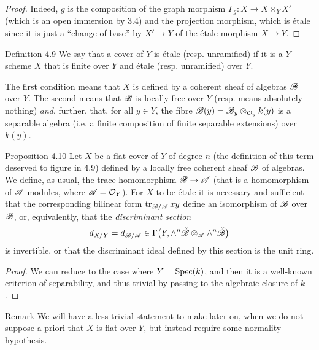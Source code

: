 \begin{proof}
  Indeed, $g$ is the composition of the graph morphism $\Gamma_g\colon X\to X\times_Y X'$ (which is an open immersion by \hyperref[I.3.4]{3.4}) and the projection morphism, which is étale since it is just a ``change of base'' by $X'\to Y$ of the étale morphism $X\to Y$.
\end{proof}

\begin{rmenv}{Definition 4.9}
\label{I.4.9}
  We say that a cover of $Y$ is étale (resp. unramified) if it is a $Y$-scheme $X$ that is finite over $Y$ and étale (resp. unramified) over $Y$.
\end{rmenv}

The first condition means that $X$ is defined by a coherent sheaf of algebras ${\mathscr{B}}$ over $Y$.
The second means that ${\mathscr{B}}$ is locally free over $Y$ (resp. means absolutely nothing) \emph{and}, further, that, for all $y\in Y$, the fibre ${\mathscr{B}}(y)={\mathscr{B}}_y\otimes_{{\mathcal{O}}_y}k(y)$ is a separable algebra (i.e. a finite composition of finite separable extensions) over $k(y)$.

\begin{itenv}{Proposition 4.10}
\label{4.10}
  Let $X$ be a flat cover of $Y$ of degree $n$ (the definition of this term deserved to figure in 4.9) defined by a locally free coherent sheaf ${\mathscr{B}}$ of algebras.
  We define, as usual, the trace homomorphism ${\mathscr{B}}\to{\mathscr{A}}$ (that is a homomorphism of ${\mathscr{A}}$-modules, where ${\mathscr{A}}={\mathcal{O}}_Y$).
  For $X$ to be étale it is necessary and sufficient that the corresponding bilinear form $\operatorname{tr}_{{\mathscr{B}}/{\mathscr{A}}}xy$ define an isomorphism of ${\mathscr{B}}$ over ${\mathscr{B}}$, or, equivalently, that the \emph{discriminant section}
  \[
    d_{X/Y}
    = d_{{\mathscr{B}}/{\mathscr{A}}}
    \in \Gamma\big(Y,\wedge^n\check{{\mathscr{B}}}\otimes_{\mathscr{A}}\wedge^n\check{{\mathscr{B}}}\big)
  \]
  is invertible, or that the discriminant ideal defined by this section is the unit ring.
\end{itenv}

\begin{proof}
  We can reduce to the case where $Y=\operatorname{Spec}(k)$, and then it is a well-known criterion of separability, and thus trivial by passing to the algebraic closure of $k$.
\end{proof}

\begin{rmenv}{Remark}
  We will have a less trivial statement to make later on,
  when we do not suppose a priori that $X$ is flat over $Y$, but instead require some normality hypothesis.
\end{rmenv}